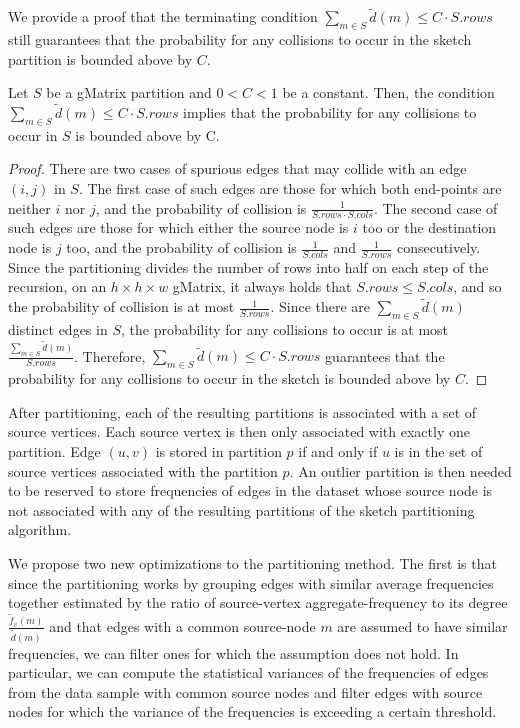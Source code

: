 We provide a proof that the terminating condition $\sum_{m \in S} \tilde{d}(m) \leq C \cdot S.rows$ still guarantees that the probability for any collisions to occur in the sketch partition is bounded above by $C$.

\begin{theorem}
Let $S$ be a gMatrix partition and $0<C<1$ be a constant. Then, the condition $\sum_{m \in S} \tilde{d}(m) \leq C \cdot S.rows$ implies that the probability for any collisions to occur in $S$ is bounded above by C.
\end{theorem}

\begin{proof}
There are two cases of spurious edges that may collide with an edge $(i,j)$ in $S$. The first case of such edges are those for which both end-points are neither $i$ nor $j$, and the probability of collision is $\frac{1}{S.rows \cdot S.cols}$. The second case of such edges are those for which either the source node is $i$ too or the destination node is $j$ too, and the probability of collision is $\frac{1}{S.cols}$ and $\frac{1}{S.rows}$ consecutively. Since the partitioning divides the number of rows into half on each step of the recursion, on an $h \times h \times w$ gMatrix, it always holds that $S.rows \leq S.cols$, and so the probability of collision is at most $\frac{1}{S.rows}$. Since there are $\sum_{m \in S} \tilde{d}(m)$ distinct edges in $S$, the probability for any collisions to occur is at most $\frac{\sum_{m \in S} \tilde{d}(m)}{S.rows}$. Therefore, $\sum_{m \in S} \tilde{d}(m) \leq C \cdot S.rows$ guarantees that the probability for any collisions to occur in the sketch is bounded above by $C$.
\end{proof}

After partitioning, each of the resulting partitions is associated with a set of source vertices. Each source vertex is then only associated with exactly one partition. Edge $(u,v)$ is stored in partition $p$ if and only if $u$ is in the set of source vertices associated with the partition $p$. An outlier partition is then needed to be reserved to store frequencies of edges in the dataset whose source node is not associated with any of the resulting partitions of the sketch partitioning algorithm.

We propose two new optimizations to the partitioning method. The first is that since the partitioning works by grouping edges with similar average frequencies together estimated by the ratio of source-vertex aggregate-frequency to its degree $\frac{\tilde{f}_v(m)}{\tilde{d}(m)}$ and that edges with a common source-node $m$ are assumed to have similar frequencies, we can filter ones for which the assumption does not hold. In particular, we can compute the statistical variances of the frequencies of edges from the data sample with common source nodes and filter edges with source nodes for which the variance of the frequencies is exceeding a certain threshold.

